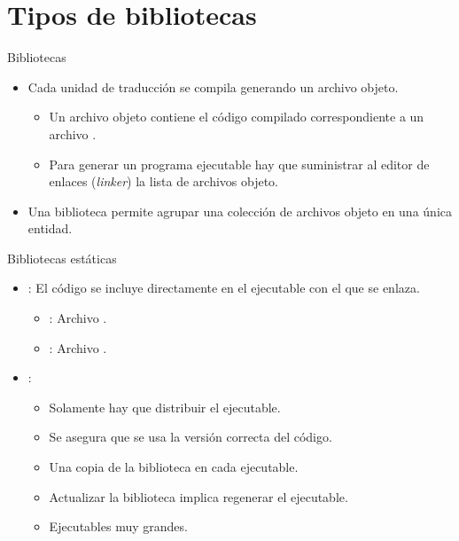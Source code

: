 \section{Tipos de bibliotecas}

\begin{frame}[t]{Bibliotecas}
\begin{itemize}
  \item Cada unidad de traducción se compila generando un archivo objeto.
    \begin{itemize}
      \item Un archivo objeto contiene el código compilado correspondiente
            a un archivo .
      \item Para generar un programa ejecutable hay que suministrar al
            editor de enlaces (\emph{linker}) la lista de archivos objeto.
    \end{itemize}
  \vfill
  \item Una biblioteca permite agrupar una colección de archivos objeto en
        una única entidad.
\end{itemize}
\end{frame}

\begin{frame}[t]{Bibliotecas estáticas}
\begin{itemize}
  \item {}: El código se incluye directamente
        en el ejecutable con el que se enlaza.
    \begin{itemize}
      \item {}: Archivo .
      \item {}: Archivo .
    \end{itemize}

  \vfill
  \item {}:
    \begin{itemize}
      \item Solamente hay que distribuir el ejecutable.
      \item Se asegura que se usa la versión correcta del código.
      \item Una copia de la biblioteca en cada ejecutable.
      \item Actualizar la biblioteca implica regenerar el ejecutable.
      \item Ejecutables muy grandes.
    \end{itemize}
\end{itemize}
\end{frame}

